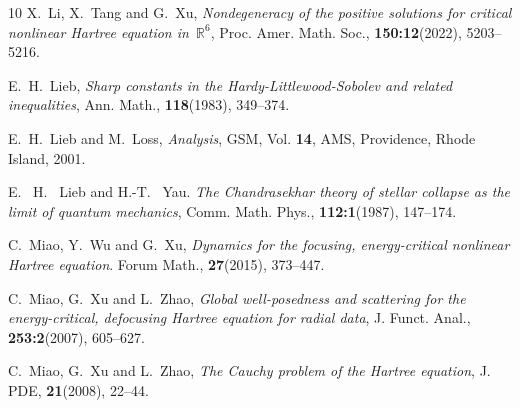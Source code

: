 \documentclass[reqno, 11pt]{amsart}
\numberwithin{equation}{section}
\newcommand{\R}{\mathbb{R}}
\theoremstyle{plain}
\theoremstyle{definition}
\numberwithin{equation}{section}
\numberwithin{theorem}{section}
\numberwithin{equation}{section}
\numberwithin{equation}{section}
\numberwithin{theorem}{section}
\begin{document}
\begin{thebibliography}{10}
		X.~Li, X.~Tang and G.~Xu,  \emph{Nondegeneracy of the positive solutions for critical nonlinear Hartree equation in $\R^6$}, Proc. Amer. Math. Soc., \textbf{150:12}(2022), 5203--5216.
		
		E.~H.~Lieb, \emph{Sharp constants in the Hardy-Littlewood-Sobolev and related inequalities}, Ann. Math., \textbf{118}(1983), 349--374.
		
		E.~H.~Lieb and M.~Loss, \emph{Analysis}, GSM, Vol. \textbf{14}, AMS, Providence, Rhode Island, 2001.
		
		E. ~H. ~Lieb and H.-T. ~Yau. \emph{The Chandrasekhar theory of stellar collapse as the limit of quantum mechanics}, Comm. Math. Phys., \textbf{112:1}(1987), 147--174.
		
		
		
		
		C.~Miao, Y.~Wu  and G.~Xu, \emph{Dynamics for the focusing, energy-critical nonlinear Hartree equation}. Forum Math., \textbf{27}(2015), 373--447.
		
		C.~Miao, G.~Xu and L.~Zhao, \emph{Global well-posedness and scattering for the energy-critical, defocusing Hartree equation for radial data}, J. Funct. Anal., \textbf{253:2}(2007), 605--627.
		
		C.~Miao, G.~Xu and L.~Zhao, \emph{The Cauchy problem of the Hartree equation}, J. PDE, \textbf{21}(2008), 22--44.
		

\end{thebibliography}
\end{document}
